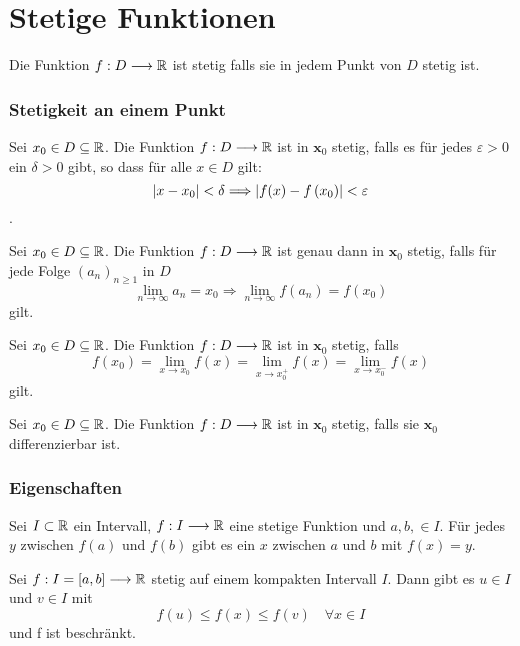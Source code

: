 \part{Stetige Funktionen}
\setcounter{section}{0}
\Def Die Funktion $f: D \longrightarrow \mathbb{R}$ ist stetig falls sie in jedem Punkt von $D$ stetig ist.

\section{Stetigkeit an einem Punkt}

\Def[Epsilon] Sei $x_{0} \in D \subseteq \mathbb{R}$. Die Funktion $f: D \longrightarrow \mathbb{R}$ ist in $\boldsymbol{x}_{0}$ stetig, falls es für jedes $\varepsilon>0$ ein $\delta>0$ gibt, so dass für alle $x \in D$ gilt: $$\left\lvert x-x_{0} \right\rvert<\delta \Longrightarrow\left\lvert f(x)-f\left(x_{0}\right) \right\rvert<\varepsilon$$.

\Satz[Sequence] Sei $x_{0} \in D \subseteq \mathbb{R}$. Die Funktion $f: D \longrightarrow \mathbb{R}$ ist genau dann in $\boldsymbol{x}_{0}$ stetig, falls für jede Folge $\left(a_{n}\right)_{n \geqslant 1}$ in $D$
	$$\lim \limits_{n \rightarrow \infty} a_{n}=x_{0} \Longrightarrow \lim \limits_{n \rightarrow \infty} f\left(a_{n}\right)=f\left(x_{0}\right)$$ gilt.
	
\Satz[Sidewise] Sei $x_{0} \in D \subseteq \mathbb{R}$. Die Funktion $f: D \longrightarrow \mathbb{R}$ ist in $\boldsymbol{x}_{0}$ stetig, falls 
	$$f(x_0) =\lim \limits_{x \rightarrow x_0} f(x) =  \lim \limits_{x \rightarrow x_0^+} f(x) = \lim \limits_{x \rightarrow x_0^-} f(x)$$ gilt.	
	
\Satz[Differentiable] Sei $x_{0} \in D \subseteq \mathbb{R}$. Die Funktion $f: D \longrightarrow \mathbb{R}$ ist in $\boldsymbol{x}_{0}$ stetig, falls sie $\boldsymbol{x}_{0}$ differenzierbar ist.

\section{Eigenschaften}

\Satz[Zwischenwertsatz] Sei $I \subset \mathbb{R}$ ein Intervall, $f: I \longrightarrow \mathbb{R}$ eine stetige Funktion und $a, b, \in I$. Für jedes $y$ zwischen $f(a)$ und $f(b)$ gibt es ein $x$ zwischen $a$ und $b$ mit $f(x)=y$.

 Sei $f: I=[a, b] \longrightarrow \mathbb{R}$ stetig auf einem kompakten Intervall $I$. Dann gibt es $u \in I$ und $v \in I$ mit
$$f(u) \leqslant f(x) \leqslant f(v) \quad \forall x \in I$$
und f ist beschränkt.

